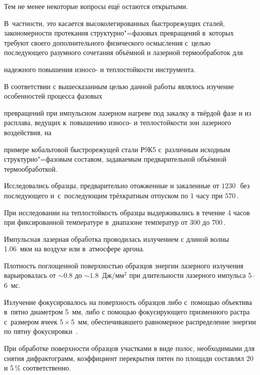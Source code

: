Тем не менее некоторые вопросы ещё остаются открытыми. 

В~частности, это касается высоколегированных быстрорежущих сталей, закономерности протекания структурно"=фазовых превращений в~которых требуют своего дополнительного физического осмысления с~целью последующего разумного сочетания объёмной и лазерной термообработок для

надежного повышения износо- и теплостойкости инструмента.



В соответствии с вышесказанным целью данной работы являлось изучение особенностей процесса фазовых

превращений при импульсном лазерном нагреве под закалку в твёрдой фазе и из расплава, ведущих к~повышению износо- и теплостойкости зон лазерного воздействия, на

примере кобальтовой быстрорежущей стали Р9К5 с~различным исходным структурно"=фазовым составом, задаваемым предварительной объёмной термообработкой.



\smallskip




Исследовались образцы, предварительно отожженные и закаленные от $1230$\,\textcelsius\ без последующего и~с~последующим трёхкратным отпуском по 1 часу при $570$\,\textcelsius. 

При исследовании на теплостойкость образцы выдерживались в течение 4 часов при фиксированной температуре в~диапазоне температур от 300 до $700$\,\textcelsius.



Импульсная лазерная обработка проводилась излучением с длиной волны 1.06~мкм на воздухе или в~атмосфере аргона. 

Плотность поглощенной поверхностью образцов энергии лазерного излучения варьировалась от $\sim 0.8$ до $\sim 1.8$~Дж/мм$^{2}$ при длительности лазерного импульса 5--6~мс. 

Излучение фокусировалось на поверхность образцов либо с~помощью объектива в~пятно диаметром 5~мм, либо с помощью фокусирующего призменного растра с~размером ячеек $5 \times 5$~мм, обеспечивавшего равномерное распределение энергии по пятну фокусировки~\cite{gureev:bib2}. 

При обработке поверхности образцов участками в виде полос, необходимыми для снятия дифрактограмм, коэффициент перекрытия пятен по площади составлял 20 и 5\,{\%} соответственно. 

